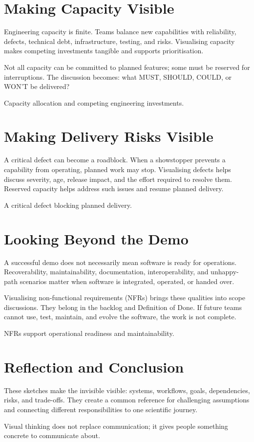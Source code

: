 \documentclass[11pt,twoside]{article}
\begin{document}
\section{Making Capacity Visible}

Engineering capacity is finite. Teams balance new capabilities
with reliability, defects, technical debt, infrastructure,
testing, and risks. Visualising capacity makes competing
investments tangible and supports prioritisation.

Not all capacity can be committed to planned features; some
must be reserved for interruptions. The discussion becomes:
what MUST, SHOULD, COULD, or WON'T be delivered?

{Capacity allocation and competing engineering investments.}


\section{Making Delivery Risks Visible}

A critical defect can become a roadblock. When a showstopper
prevents a capability from operating, planned work may stop.
Visualising defects helps discuss severity, age, release impact,
and the effort required to resolve them. Reserved capacity
helps address such issues and resume planned delivery.

{A critical defect blocking planned delivery.}


\section{Looking Beyond the Demo}

A successful demo does not necessarily mean software is ready
for operations. Recoverability, maintainability, documentation,
interoperability, and unhappy-path scenarios matter when
software is integrated, operated, or handed over.

Visualising non-functional requirements (NFRs) brings these
qualities into scope discussions. They belong in the backlog
and Definition of Done. If future teams cannot use, test,
maintain, and evolve the software, the work is not complete.

{NFRs support operational readiness and maintainability.}


\section{Reflection and Conclusion}

These sketches make the invisible visible: systems, workflows,
goals, dependencies, risks, and trade-offs. They create a
common reference for challenging assumptions and connecting
different responsibilities to one scientific journey.

Visual thinking does not replace communication; it gives
people something concrete to communicate about.
\end{document}
